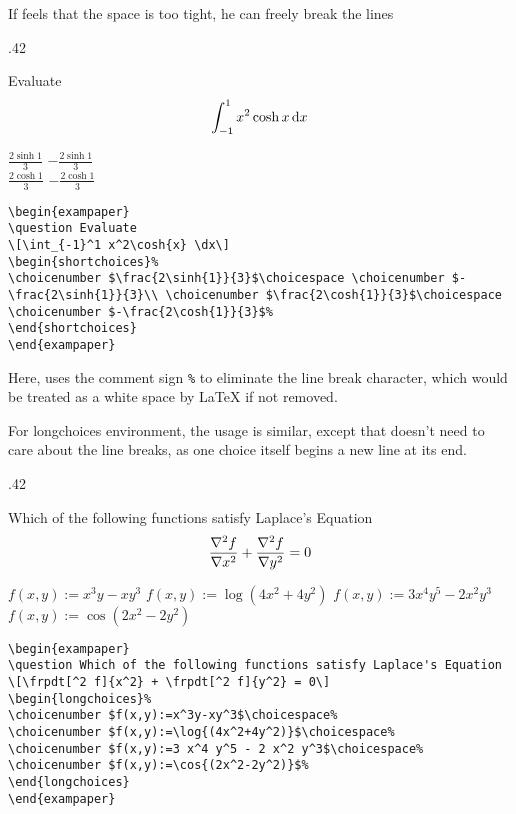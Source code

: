 If \raul{} feels that the space is too tight, he can freely break the lines
\begin{miniexammar}{.42\textandmarginlen}{
\begin{exampaper}
\question Evaluate
\[
\int_{-1}^1 x^2\cosh{x} \dx
\]
\begin{shortchoices}%
\choicenumber $\frac{2\sinh{1}}{3}$\choicespace%
\choicenumber $-\frac{2\sinh{1}}{3}$\\
\choicenumber $\frac{2\cosh{1}}{3}$\choicespace%
\choicenumber $-\frac{2\cosh{1}}{3}$%
\end{shortchoices}
\end{exampaper}
}
\begin{lstlisting}
\begin{exampaper}
\question Evaluate
\[\int_{-1}^1 x^2\cosh{x} \dx\]
\begin{shortchoices}%
\choicenumber $\frac{2\sinh{1}}{3}$\choicespace \choicenumber $-\frac{2\sinh{1}}{3}\\ \choicenumber $\frac{2\cosh{1}}{3}$\choicespace \choicenumber $-\frac{2\cosh{1}}{3}$%
\end{shortchoices}
\end{exampaper}
\end{lstlisting}
\end{miniexammar}
Here, \raul{} uses the comment sign \verb=%= to eliminate the line break character, which would be treated as a white space by \LaTeX{} if not removed.

For longchoices environment, the usage is similar, except that \raul{} doesn't need to care about the line breaks, as one choice itself begins a new line at its end.
\begin{miniexammar}{.42\textandmarginlen}{
\begin{exampaper}
\question Which of the following functions satisfy Laplace's Equation
\[\frpdt[^2 f]{x^2} + \frpdt[^2 f]{y^2} = 0\]
\begin{longchoices}%
\choicenumber $f(x,y):=x^3y-xy^3$\choicespace%
\choicenumber $f(x,y):=\log{(4x^2+4y^2)}$\choicespace%
\choicenumber $f(x,y):=3 x^4 y^5 - 2 x^2 y^3$\choicespace%
\choicenumber $f(x,y):=\cos{(2x^2-2y^2)}$%
\end{longchoices}
\end{exampaper}
}
\begin{lstlisting}
\begin{exampaper}
\question Which of the following functions satisfy Laplace's Equation
\[\frpdt[^2 f]{x^2} + \frpdt[^2 f]{y^2} = 0\]
\begin{longchoices}%
\choicenumber $f(x,y):=x^3y-xy^3$\choicespace%
\choicenumber $f(x,y):=\log{(4x^2+4y^2)}$\choicespace%
\choicenumber $f(x,y):=3 x^4 y^5 - 2 x^2 y^3$\choicespace%
\choicenumber $f(x,y):=\cos{(2x^2-2y^2)}$%
\end{longchoices}
\end{exampaper}
\end{lstlisting}
\end{miniexammar}

